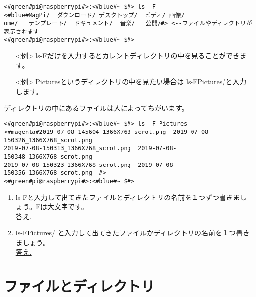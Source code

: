 \begin{lstlisting}[caption=ls -F コマンドの例,label=lsFtest]
<#green#pi@raspberrypi#>:<#blue#~ $#> ls -F
<#blue#MagPi/  ダウンロード/ デスクトップ/  ビデオ/ 画像/
ome/   テンプレート/  ドキュメント/  音楽/   公開/#> <--ファイルやディレクトリが表示されます
<#green#pi@raspberrypi#>:<#blue#~ $#>
\end{lstlisting}

\begin{itemize}
\item[<例>] ls\textvisiblespace -Fだけを入力するとカレントディレクトリの中を見ることができます。 
\item[<例>] Picturesというディレクトリの中を見たい場合は ls\textvisiblespace -F\textvisiblespace Pictures/と入力します。 
\end{itemize}

ディレクトリの中にあるファイルは人によってちがいます。
\begin{lstlisting}[caption=ls -F Pictures/コマンドの例,label=lsFPicttest]
<#green#pi@raspberrypi#>:<#blue#~ $#> ls -F Pictures
<#magenta#2019-07-08-145604_1366X768_scrot.png  2019-07-08-150326_1366X768_scrot.png  
2019-07-08-150313_1366X768_scrot.png  2019-07-08-150348_1366X768_scrot.png  
2019-07-08-150323_1366X768_scrot.png  2019-07-08-150356_1366X768_scrot.png  #>
<#green#pi@raspberrypi#>:<#blue#~ $#> 
\end{lstlisting}

\begin{tcolorbox}[title=\useOmetoi]
\begin{enumerate}
\item ls\textvisiblespace -Fと入力して出てきたファイルとディレクトリの名前を１つずつ書きましょう。Fは大文字です。\\
\underline{答え.\hspace{0.8\linewidth}}
\item ls\textvisiblespace -F\textvisiblespace Pictures/ と入力して出てきたファイルかディレクトリの名前を１つ書きましょう。\\
\underline{答え.\hspace{0.8\linewidth}}
\end{enumerate}
\end{tcolorbox}




\section{ファイルとディレクトリ}

